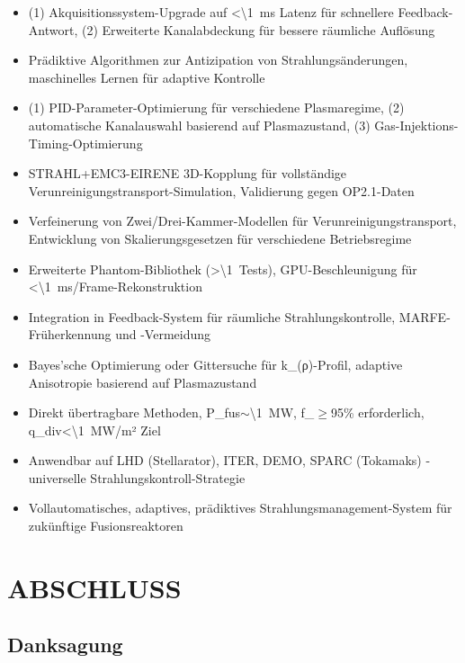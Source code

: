 \documentclass[11pt,a4paper]{article}
\begin{document}
\begin{itemize}
\item \textbf{\1} (1) Akquisitionssystem-Upgrade auf <\SI{\1}{m}s Latenz für schnellere Feedback-Antwort, (2) Erweiterte Kanalabdeckung für bessere räumliche Auflösung
\item \textbf{\1} Prädiktive Algorithmen zur Antizipation von Strahlungsänderungen, maschinelles Lernen für adaptive Kontrolle
\item \textbf{\1} (1) PID-Parameter-Optimierung für verschiedene Plasmaregime, (2) automatische Kanalauswahl basierend auf Plasmazustand, (3) Gas-Injektions-Timing-Optimierung
\item \textbf{\1} STRAHL+EMC3-EIRENE 3D-Kopplung für vollständige Verunreinigungstransport-Simulation, Validierung gegen OP2.1-Daten
\item \textbf{\1} Verfeinerung von Zwei/Drei-Kammer-Modellen für Verunreinigungstransport, Entwicklung von Skalierungsgesetzen für verschiedene Betriebsregime
\item \textbf{\1} Erweiterte Phantom-Bibliothek (>\SI{\1}{T}ests), GPU-Beschleunigung für <\SI{\1}{m}s/Frame-Rekonstruktion
\item \textbf{\1} Integration in Feedback-System für räumliche Strahlungskontrolle, MARFE-Früherkennung und -Vermeidung
\item \textbf{\1} Bayes'sche Optimierung oder Gittersuche für k_{}(ρ)-Profil, adaptive Anisotropie basierend auf Plasmazustand
\item \textbf{\1} Direkt übertragbare Methoden, P_fus$\sim$\SI{\1}{MW}, f_{}$\geq$95\% erforderlich, q_div<\SI{\1}{MW}/m² Ziel
\item \textbf{\1} Anwendbar auf LHD (Stellarator), ITER, DEMO, SPARC (Tokamaks) - universelle Strahlungskontroll-Strategie
\item \textbf{\1} Vollautomatisches, adaptives, prädiktives Strahlungsmanagement-System für zukünftige Fusionsreaktoren
\end{itemize}

\section{ABSCHLUSS}

\subsection{Danksagung}
\end{document}
